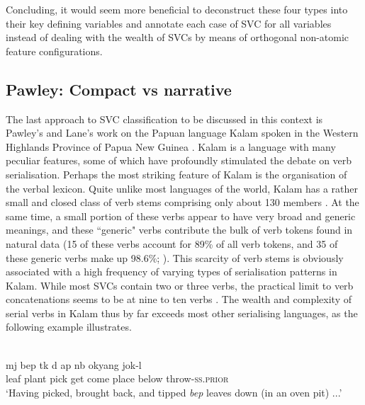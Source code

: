 Concluding, it would seem more beneficial to deconstruct these four types into their key defining variables and annotate each case of SVC for all variables instead of dealing with the wealth of SVCs by means of orthogonal non-atomic feature configurations. 

\subsection{Pawley: Compact vs narrative}

The last approach to SVC classification to be discussed in this context is Pawley's and Lane's work on the Papuan language Kalam spoken in the Western Highlands Province of Papua New Guinea \citep{Pawley1987, pawley1991saying, pawley2008serial, pawley2011event, lane2008kalam}. Kalam is a language with many peculiar features, some of which have profoundly stimulated the debate on verb serialisation. Perhaps the most striking feature of Kalam is the organisation of the verbal lexicon. Quite unlike most languages of the world, Kalam has a rather small and closed class of verb stems comprising only about 130 members \citep[7]{lane2008kalam}. At the same time, a small portion of these verbs appear to have very broad and generic meanings, and these ``generic" verbs contribute the bulk of verb tokens found in natural data (15 of these verbs account for 89\% of all verb tokens, and 35 of these generic verbs make up 98.6\%; \citealt[7]{lane2008kalam}). This scarcity of verb stems is obviously associated with a high frequency of varying types of serialisation patterns in Kalam. While most SVCs contain two or three verbs, the practical limit to verb concatenations seems to be at nine to ten verbs \citep[172]{pawley2008serial}. The wealth and complexity of serial verbs in Kalam thus by far exceeds most other serialising languages, as the following example illustrates.

\ea \label{kalam1}
\\
\gll mj bep tk d ap nb okyang jok-l \\
leaf plant pick get come place below throw-\textsc{ss}.\textsc{prior} \\
\glft `Having picked, brought back, and tipped \textit{bep} leaves down (in an oven pit) ...'\\ 
\z


